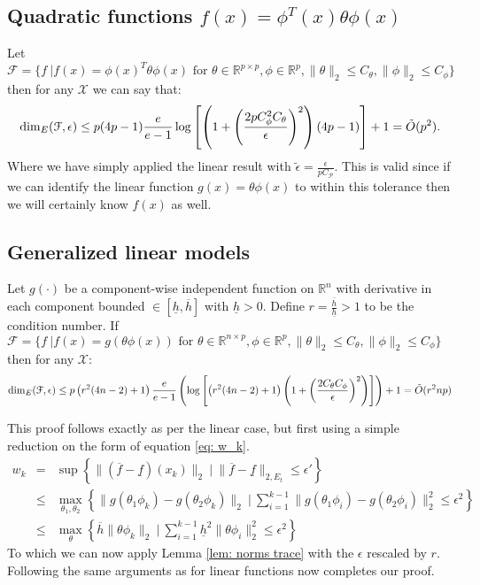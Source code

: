 \documentclass{article}
\newcommand{\Real}{\mathds{R}}
\newcommand{\Xc}{\mathcal{X}}
\newcommand{\Pc}{\mathcal{P}}
\newcommand{\Fc}{\mathcal{F}}
\begin{document}
\subsection{Quadratic functions $f(x) = \phi^T(x) \theta \phi(x) $}
Let $\mathcal{F} = \{ f \ | f(x) = \phi(x)^T \theta \phi(x)  \text{ for } \theta \in \Real^{p \times p}, \phi \in \Real^p ,
\|\theta \|_2 \le C_\theta , \|\phi\|_2 \le C_\phi \}$ then for any $\Xc$ we can say that:
$$ {\rm dim}_E(\Fc, \epsilon) \le p(4p-1)\frac{e}{e-1} \log\left[ \left(1+\left( \frac{2 p C_\phi^2 C_\theta}{\epsilon}\right)^2 \right)\left(4p-1\right) \right] + 1 = \tilde{O}(p^2). $$
Where we have simply applied the linear result with $\tilde{\epsilon} = \frac{\epsilon}{p C_\Pc}$.
This is valid since if we can identify the linear function $g(x) = \theta \phi(x)$ to within this tolerance then we will certainly know $f(x)$ as well.


\subsection{Generalized linear models}
Let $g(\cdot)$ be a component-wise independent function on $\Real^n$ with derivative in each component bounded  $\in [\underline{h},\overline{h}]$ with $\underline{h}>0$.
Define $r = \frac{\overline{h}}{\underline{h}} > 1$ to be the condition number.
If $\mathcal{F} = \{ f \ | f(x) = g(\theta \phi(x))  \text{ for } \theta \in \Real^{n \times p}, \phi \in \Real^p ,
\|\theta \|_2 \le C_\theta , \|\phi\|_2 \le C_\phi \}$
then for any $\Xc$:
$${\rm dim}_E(\Fc, \epsilon) \le p \left(r^2(4n-2)+1\right)\frac{e}{e-1} \left(\log \left[\left(r^2(4n-2)+1 \right) \left(1+ \left(\frac{2C_\theta C_\phi}{\epsilon} \right)^2\right) \right] \right) + 1 = \tilde{O}(r^2 np)$$

This proof follows exactly as per the linear case, but first using a simple reduction on the form of equation \eqref{eq: w_k}.
\begin{eqnarray*}
	w_k &=& \sup \left\{ \|(\overline{f} - \underline{f}) (x_k)\|_2 \ \bigg| \  \|\overline{f}-\underline{f}\|_{2,E_t} \le \epsilon' \right\} \\
	&\le& \max_{\theta_1, \theta_2} \left\{ \|g(\theta_1 \phi_k) - g(\theta_2 \phi_k) \|_2 \ \big| \
		\sum_{i=1}^{k-1} \|g(\theta_1 \phi_i) - g(\theta_2 \phi_i) \|_2^2 \le \epsilon^2 \right\} \\
	&\le& \max_\theta \left\{ \overline{h} \|\theta \phi_k \|_2 \ \big| \
		\sum_{i=1}^{k-1} \underline{h}^2 \| \theta \phi_i \|_2^2 \le \epsilon^2 \right\}
\end{eqnarray*}
To which we can now apply Lemma \ref{lem: norms trace} with the $\epsilon$ rescaled by $r$.
Following the same arguments as for linear functions now completes our proof.
\end{document}

